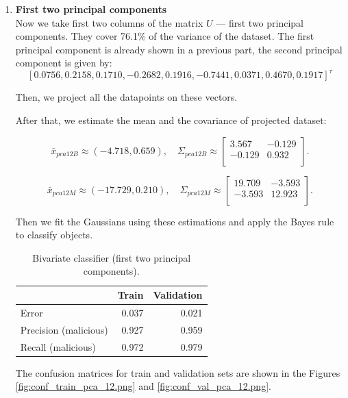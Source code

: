 \documentclass[11pt,a4paper]{article}
\begin{document}
\begin{enumerate}
\begin{enumerate}
	\item \textbf {First two principal components} \\
	Now we take first two columns of the matrix $U$ --- first two principal components. They cover 76.1\% of the variance of the dataset.
	The first principal component is already shown in a previous part, the second principal component is given by:
	 $$ [0.0756,  0.2158,  0.1710, -0.2682,  0.1916, -0.7441,  0.0371,  0.4670,  0.1917]^\tau$$
	
	 Then, we project all the datapoints on these vectors.
	
	After that, we estimate the mean and the covariance of projected dataset:
	
	\[
	\bar{x}_{pca12B} \approx (-4.718,  0.659), \quad 
	\Sigma_{pca12B} \approx 
	\begin{bmatrix}
	3.567 & -0.129   \\
	-0.129 & 0.932   \\
	\end{bmatrix}.
	\]
	
	\[
	\bar{x}_{pca12M} \approx (-17.729,  0.210), \quad 
	\Sigma_{pca12M} \approx 
	\begin{bmatrix}
	19.709 & -3.593  \\
	-3.593 & 12.923   \\
	\end{bmatrix}.
	\]
	
	
	Then we fit the Gaussians using these estimations and apply the Bayes rule to classify objects.

	
	\begin{table}[H]
		\centering
		\begin{tabular}{lrr}
			\toprule
			& \textbf{Train} & \textbf{Validation}  \\ \midrule
			Error & 0.037 & 0.021 \\	
			Precision (malicious) & 0.927 & 0.959 \\
			Recall (malicious) & 0.972 & 0.979 \\
			\bottomrule
		\end{tabular}
		\caption{Bivariate classifier (first two principal components).}
		\label{tab:results-pca-12}
	\end{table}
	
	The confusion matrices for train and validation sets are shown in the Figures \ref{fig:conf_train_pca_12.png} and \ref{fig:conf_val_pca_12.png}.
	

\end{enumerate}
\end{enumerate}
\end{document}
